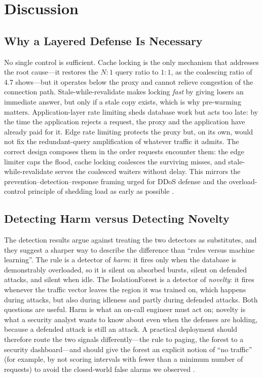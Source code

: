 \section{Discussion}
\label{sec:discussion}

\subsection{Why a Layered Defense Is Necessary}
No single control is sufficient. Cache locking is the only mechanism that addresses the
root cause---it restores the $N{:}1$ query ratio to $1{:}1$, as the coalescing ratio of
4.7 shows---but it operates below the proxy and cannot relieve congestion of the
connection path. Stale-while-revalidate makes locking \emph{fast} by giving losers an
immediate answer, but only if a stale copy exists, which is why pre-warming matters.
Application-layer rate limiting sheds database work but acts too late: by the time the
application rejects a request, the proxy and the application have already paid for
it. Edge rate limiting protects the proxy but, on its own, would not fix the
redundant-query amplification of whatever traffic it admits. The correct design
composes them in the order requests encounter them: the edge limiter caps the flood,
cache locking coalesces the surviving misses, and stale-while-revalidate serves the
coalesced waiters without delay. This mirrors the prevention--detection--response
framing urged for DDoS defense \cite{zargar2013} and the overload-control principle of
shedding load as early as possible \cite{welsh2001,beyer2016}.

\subsection{Detecting Harm versus Detecting Novelty}
The detection results argue against treating the two detectors as substitutes, and
they suggest a sharper way to describe the difference than ``rules versus machine
learning''. The rule is a detector of \emph{harm}: it fires only when the database is
demonstrably overloaded, so it is silent on absorbed bursts, silent on defended
attacks, and silent when idle. The IsolationForest is a detector of \emph{novelty}: it
fires whenever the traffic vector leaves the region it was trained on, which happens
during attacks, but also during idleness and partly during defended attacks. Both
questions are useful. Harm is what an on-call engineer must act on; novelty is what a
security analyst wants to know about even when the defenses are holding, because a
defended attack is still an attack. A practical deployment should therefore route the
two signals differently---the rule to paging, the forest to a security dashboard---and
should give the forest an explicit notion of ``no traffic'' (for example, by not
scoring intervals with fewer than a minimum number of requests) to avoid the
closed-world false alarms we observed \cite{sommer2010}.

